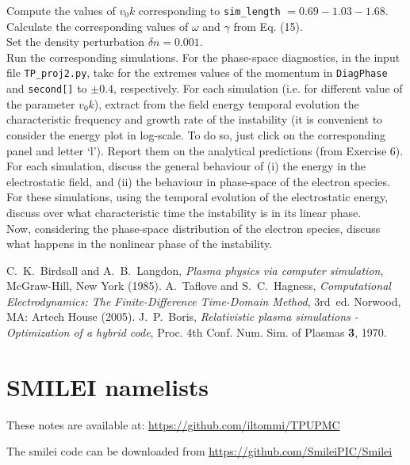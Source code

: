 \documentclass[11pt,a4paper]{article}
\let\oldlstinputlisting
\renewcommand{}[2][]{%
    \oldlstinputlisting[caption={\texttt{\detokenize{#2}}},#1]{#2}%
}
\begin{document}
  Compute the values of $v_0 k$ corresponding to \texttt{sim\_length} $= 0.69 - 1.03 - 1.68$. Calculate the corresponding values of $\omega$ and $\gamma$ from Eq. (15).\\Set the density perturbation $\delta n = 0.001$. \\
 Run the corresponding simulations. For the phase-space diagnostics, in the input file \texttt{TP\_proj2.py},  take for the extremes values of the momentum in \texttt{DiagPhase} and \texttt{second[]}   to $\pm 0.4$, respectively. For each simulation (i.e. for different value of the parameter $v_0 k$), extract from the field energy temporal evolution the characteristic frequency and growth rate of the instability (it is convenient to consider the energy plot in log-scale. To do so, just click on the corresponding panel and letter `l'). Report them on the analytical predictions (from Exercise 6).\\
 For each simulation, discuss the general behaviour of (i) the energy in the electrostatic field, and (ii) the behaviour in phase-space of the electron species. \\
 For these simulations, using the temporal evolution of the electrostatic energy, discuss over what characteristic time the instability is in its linear phase.\\
 Now, considering the phase-space distribution of the electron species, discuss what happens in the nonlinear phase of the instability.






\begin{thebibliography}{2}

 C.~K.~Birdsall and A.~B.~Langdon, {\it Plasma physics via computer simulation}, McGraw-Hill, New York (1985).
 A.~Taflove and S.~C.~Hagness, {\it Computational Electrodynamics: The Finite-Difference Time-Domain Method}, 3rd~ed. Norwood, MA: Artech House (2005).
 J.~P.~Boris, {\it Relativistic plasma simulations - Optimization of a hybrid code}, Proc. 4th Conf. Num. Sim. of Plasmas {\bf 3}, 1970.


\end{thebibliography}
\newpage
\section*{SMILEI namelists}




These notes are available at: \url{https://github.com/iltommi/TPUPMC}

The smilei code can be downloaded from \url{https://github.com/SmileiPIC/Smilei}
\end{document}

